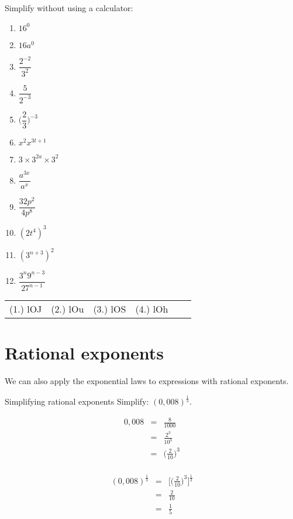 \begin{exercises}{}{
Simplify without using a calculator:
\begin{multicols}{2}
\begin{enumerate}[label=\textbf{\arabic*}., itemsep=5pt]
 \item $16^0$
 \item $16a^0$
 \item $\dfrac{2^{-2}}{3^2}$
 \item $ \dfrac{5}{2^{-3}}$
 \item $ \Big(\dfrac{2}{3}\Big)^{-3} $
 \item $ x^2 x^{3t+1} $
 \item $ 3 \times 3^{2a} \times 3^2$
 \item $ \dfrac{a^{3x}}{a^x} $
 \item $ \dfrac{32p^2}{4p^8}$
 \item $ (2t^4)^3$
 \item $ (3^{n+3})^2$
 \item $ \dfrac{3^n 9^{n-3}}{27^{n-1}}$
\end{enumerate}
\end{multicols}
\practiceinfo
\par \practiceinfo
\begin{tabular}[h]{cccccc}
(1.) lOJ  &  (2.) lOu  &  (3.) lOS  &  (4.) lOh  & 
\end{tabular}
}
\end{exercises}

\section{Rational exponents}

We can also apply the exponential laws to expressions with rational exponents.
\begin{wex}
{%
Simplifying rational exponents
} 
{%
Simplify: 
$ (0,008)^{\frac{1}{3}}.$
}
{%

\begin{eqnarray*}
 0,008 & = & \frac{8}{1000} \\
       & = & \frac{2^3}{10^3} \\
       & = & \Big(\frac{2}{10}\Big)^3\\
\end{eqnarray*}

\begin{eqnarray*}
 (0,008)^{\frac{1}{3}} & = & \Big[\Big(\frac{2}{10}\Big)^3\Big]^{\frac{1}{3}} \\
		 & = & \frac{2}{10} \\
		 & = & \frac{1}{5}
\end{eqnarray*}
}
\end{wex}

